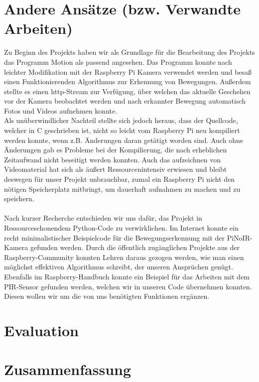 \documentclass[journal]{IEEEtran}
\begin{document}
\section{Andere Ansätze (bzw. Verwandte Arbeiten)} 
Zu Beginn des Projekts haben wir als Grundlage für die Bearbeitung des Projekts das Programm Motion\cite{motion} als passend angesehen. Das Programm konnte nach leichter Modifikation mit der Raspberry Pi Kamera verwendet werden und besaß einen Funktionierenden Algorithmus zur Erkennung von Bewegungen. Außerdem stellte es einen http-Stream zur Verfügung, über welchen das aktuelle Geschehen vor der Kamera beobachtet werden und nach erkannter Bewegung automatisch Fotos und Videos aufnehmen konnte. \\ Als unüberwindlicher Nachteil stellte sich jedoch heraus, dass der Quellcode, welcher in C geschrieben ist, nicht so leicht vom Raspberry Pi neu kompiliert werden konnte, wenn z.B. Änderungen daran getätigt worden sind. Auch ohne Änderungen gab es Probleme bei der Kompilierung, die nach erheblichen Zeitaufwand nicht beseitigt werden konnten. Auch das aufzeichnen von Videomaterial hat sich als äußert Ressourcenintensiv erwiesen und bleibt deswegen für unser Projekt unbrauchbar, zumal ein Raspberry Pi nicht den nötigen Speicherplatz mitbringt, um dauerhaft aufnahmen zu machen und zu speichern.\\ \\Nach kurzer Recherche entschieden wir uns dafür, das Projekt in Ressourceschonendem Python-Code zu verwirklichen. Im Internet konnte ein recht minimalistischer Beispielcode für die Bewegungserkennung mit der PiNoIR-Kamera gefunden werden\cite{motioncode}. Durch die öffentlich zugänglichen Projekte aus der Raspberry-Community konnten Lehren daraus gezogen werden, wie man einen möglichst effektiven Algorithmus schreibt, der unseren Ansprüchen genügt. Ebenfalls im Raspberry-Handbuch konnte ein Beispiel für das Arbeiten mit dem PIR-Sensor gefunden werden\cite[S. 495]{Raspi}, welchen wir in unseren Code übernehmen konnten. Diesen wollen wir um die von uns benötigten Funktionen ergänzen.\\




\section{Evaluation}




\section{Zusammenfassung}





\printbibliography
\end{document}
